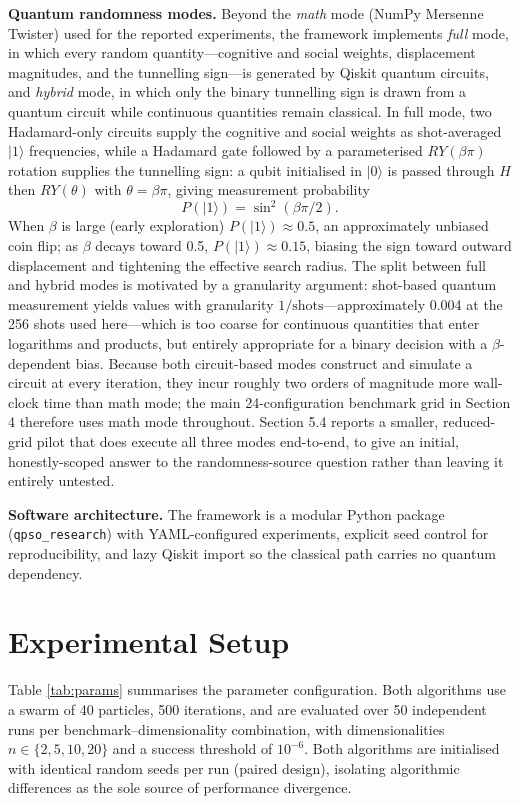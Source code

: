 \documentclass[11pt]{article}
\begin{document}
\textbf{Quantum randomness modes.} Beyond the \emph{math} mode (NumPy Mersenne Twister) used for the reported experiments, the framework implements \emph{full} mode, in which every random quantity---cognitive and social weights, displacement magnitudes, and the tunnelling sign---is generated by Qiskit quantum circuits, and \emph{hybrid} mode, in which only the binary tunnelling sign is drawn from a quantum circuit while continuous quantities remain classical. In full mode, two Hadamard-only circuits supply the cognitive and social weights as shot-averaged $|1\rangle$ frequencies, while a Hadamard gate followed by a parameterised $RY(\beta\pi)$ rotation supplies the tunnelling sign: a qubit initialised in $|0\rangle$ is passed through $H$ then $RY(\theta)$ with $\theta=\beta\pi$, giving measurement probability
\begin{equation}
P(|1\rangle) = \sin^2(\beta\pi/2).
\end{equation}
When $\beta$ is large (early exploration) $P(|1\rangle)\approx 0.5$, an approximately unbiased coin flip; as $\beta$ decays toward 0.5, $P(|1\rangle)\approx 0.15$, biasing the sign toward outward displacement and tightening the effective search radius. The split between full and hybrid modes is motivated by a granularity argument: shot-based quantum measurement yields values with granularity $1/\text{shots}$---approximately 0.004 at the 256 shots used here---which is too coarse for continuous quantities that enter logarithms and products, but entirely appropriate for a binary decision with a $\beta$-dependent bias. Because both circuit-based modes construct and simulate a circuit at every iteration, they incur roughly two orders of magnitude more wall-clock time than math mode; the main 24-configuration benchmark grid in Section 4 therefore uses math mode throughout. Section 5.4 reports a smaller, reduced-grid pilot that does execute all three modes end-to-end, to give an initial, honestly-scoped answer to the randomness-source question rather than leaving it entirely untested.

\textbf{Software architecture.} The framework is a modular Python package (\texttt{qpso\_research}) with YAML-configured experiments, explicit seed control for reproducibility, and lazy Qiskit import so the classical path carries no quantum dependency.

\vspace{-0.3em}
\section{Experimental Setup}
Table \ref{tab:params} summarises the parameter configuration. Both algorithms use a swarm of 40 particles, 500 iterations, and are evaluated over 50 independent runs per benchmark--dimensionality combination, with dimensionalities $n \in \{2,5,10,20\}$ and a success threshold of $10^{-6}$. Both algorithms are initialised with identical random seeds per run (paired design), isolating algorithmic differences as the sole source of performance divergence.
\end{document}
